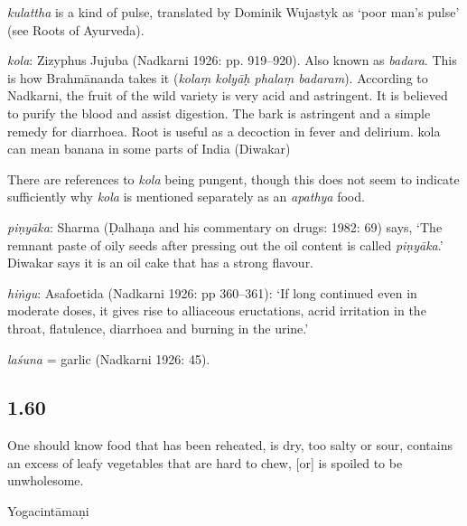 \begin{ekdosis}
\begin{philcomm}[hp01_059]
\emph{kulattha} is a kind of pulse, translated by Dominik Wujastyk as `poor man's pulse' (see Roots of Ayurveda).

\emph{kola}: Zizyphus Jujuba (Nadkarni 1926: pp. 919--920). Also known as \emph{badara}. This is how Brahmānanda takes it (\emph{kolaṃ kolyāḥ phalaṃ badaram}). According to Nadkarni, the fruit of the wild variety is very acid and astringent. It is believed to purify the blood and assist digestion. The bark is astringent and a simple remedy for diarrhoea. Root is useful as a decoction in fever and delirium.
kola can mean banana in some parts of India (Diwakar)

There are references to \emph{kola} being pungent, though this does not seem to indicate sufficiently why \emph{kola} is mentioned separately as an \emph{apathya} food.

\emph{piṇyāka}: Sharma (Ḍalhaṇa and his commentary on drugs: 1982: 69) says, ‘The remnant paste of oily seeds after pressing out the oil content is called \emph{piṇyāka}.’ Diwakar says it is an oil cake that has a strong flavour.

\emph{hiṅgu}: Asafoetida (Nadkarni 1926: pp 360–361): `If long continued even in moderate doses, it gives rise to alliaceous eructations, acrid irritation in the throat, flatulence, diarrhoea and burning in the urine.'

\emph{laśuna} = garlic (Nadkarni 1926: 45).
\end{philcomm}

\subsection*{1.60}
\begin{translation}[hp01_060]
One should know food that has been reheated, is dry, too salty or sour, contains an excess of leafy vegetables that are hard to chew, [or] is spoiled to be unwholesome.
\end{translation}

\begin{sources}[hp01_060]
\end{sources}

\begin{testimonia}[hp01_060]
Yogacintāmaṇi

\begin{versinnote}
\end{versinnote}


\end{testimonia}
\end{ekdosis}

